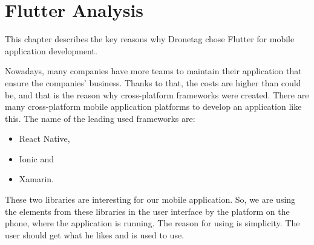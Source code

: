 \chapter{Flutter Analysis}\label{ch:flutter-analysis}

This chapter describes the key reasons why Dronetag chose Flutter for mobile application development.

Nowadays, many companies have more teams to maintain their application that ensure the companies’ business.
Thanks to that, the costs are higher than could be, and that is the reason why cross-platform frameworks were created.
There are many cross-platform mobile application platforms to develop an application like this.
The name of the leading used frameworks are:
\begin{itemize}
    \item React Native,
    \item Ionic and
    \item Xamarin.
\end{itemize}
















These two libraries are interesting for our mobile application.
So, we are using the elements from these libraries in the user interface by the platform on the phone, where the application is running.
The reason for using is simplicity.
The user should get what he likes and is used to use.
